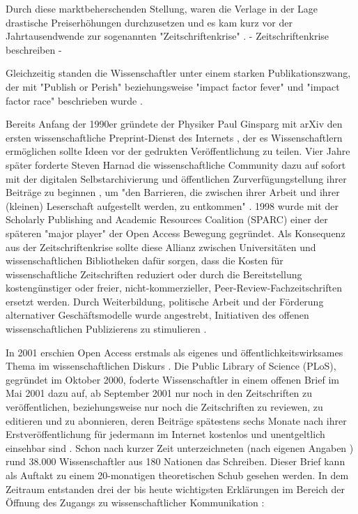 Durch diese marktbeherschenden Stellung, waren die Verlage in der Lage drastische Preiserhöhungen durchzusetzen und es kam kurz vor der Jahrtausendwende zur sogenannten "Zeitschriftenkrise" \cite{suchen}. 
- Zeitschriftenkrise beschreiben -

Gleichzeitig standen die Wissenschaftler unter einem starken Publikationszwang, der mit "Publish or Perish" \cite{CLAPHAM_2005} beziehungsweise "impact factor fever" \cite{Cherubini_2008} und "impact factor race" \cite{Brischoux_2009} beschrieben wurde \cite{offhaus_2012_institutionelle_repos}. 

Bereits Anfang der 1990er gründete der Physiker Paul Ginsparg mit arXiv den ersten wissenschaftliche Preprint-Dienst des Internets \cite{suchen}, der es Wissenschaftlern ermöglichen sollte Ideen vor der gedrukten Veröffentlichung zu teilen. Vier Jahre später forderte Steven Harnad die wissenschaftliche Community dazu auf sofort mit der digitalen Selbstarchivierung und öffentlichen Zurverfügungstellung ihrer Beiträge zu beginnen \cite{albert_2006_open_implications}, um "den Barrieren, die zwischen ihrer Arbeit und ihrer (kleinen) Leserschaft aufgestellt werden, zu entkommen" \cite{harnad_1995_subversive_proposal}. 1998 wurde mit der Scholarly Publishing and Academic Resources Coalition (SPARC) einer der späteren "major player" der Open Access Bewegung\cite{russell2008business} gegründet. Als Konsequenz aus der Zeitschriftenkrise sollte diese Allianz zwischen Universitäten und wissenschaftlichen Bibliotheken dafür sorgen, dass die Kosten für wissenschaftliche Zeitschriften reduziert oder durch die Bereitstellung kostengünstiger oder freier, nicht-kommerzieller, Peer-Review-Fachzeitschriften ersetzt werden. Durch Weiterbildung, politische Arbeit und der Förderung alternativer Geschäftsmodelle wurde angestrebt, Initiativen des offenen wissenschaftlichen Publizierens zu stimulieren \cite{suchen}.

In 2001 erschien Open Access erstmals als eigenes und öffentlichkeitswirksames Thema im wissenschaftlichen Diskurs \cite{cite:19}. Die Public Library of Science (PLoS), gegründet im Oktober 2000, foderte Wissenschaftler in einem offenen Brief im Mai 2001 dazu auf, ab September 2001 nur noch in den Zeitschriften zu veröffentlichen, beziehungsweise nur noch die Zeitschriften zu reviewen, zu editieren und zu abonnieren, deren Beiträge spätestens sechs Monate nach ihrer Erstveröffentlichung für jedermann im Internet kostenlos und unentgeltlich einsehbar sind \cite{cite:20}. Schon nach kurzer Zeit unterzeichneten (nach eigenen Angaben \cite{cite:19a}) rund 38.000 Wissenschaftler aus 180 Nationen das Schreiben. Dieser Brief kann als Auftakt zu einem 20-monatigen theoretischen Schub gesehen werden. In dem Zeitraum entstanden drei der bis heute wichtigsten Erklärungen im Bereich der Öffnung des Zugangs zu wissenschaftlicher Kommunikation \cite{CREATe_2014}: 

